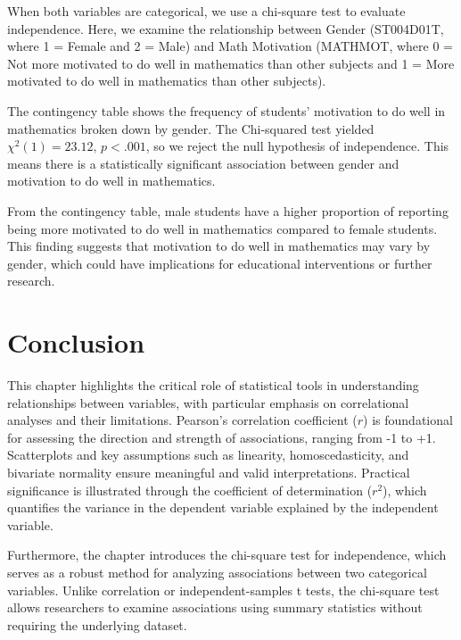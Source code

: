 \documentclass[
  letterpaper,
  DIV=11,
  numbers=noendperiod]{scrreprt}
\begin{document}

When both variables are categorical, we use a chi-square test to
evaluate independence. Here, we examine the relationship between Gender
(ST004D01T, where 1 = Female and 2 = Male) and Math Motivation (MATHMOT,
where 0 = Not more motivated to do well in mathematics than other
subjects and 1 = More motivated to do well in mathematics than other
subjects).

The contingency table shows the frequency of students' motivation to do
well in mathematics broken down by gender. The Chi-squared test yielded
\(\chi^2(1)=23.12, \, p<.001\), so we reject the null hypothesis of
independence. This means there is a statistically significant
association between gender and motivation to do well in mathematics.

From the contingency table, male students have a higher proportion of
reporting being more motivated to do well in mathematics compared to
female students. This finding suggests that motivation to do well in
mathematics may vary by gender, which could have implications for
educational interventions or further research.


\chapter*{Conclusion}\label{conclusion-10}


This chapter highlights the critical role of statistical tools in
understanding relationships between variables, with particular emphasis
on correlational analyses and their limitations. Pearson's correlation
coefficient (\(r\)) is foundational for assessing the direction and
strength of associations, ranging from -1 to +1. Scatterplots and key
assumptions such as linearity, homoscedasticity, and bivariate normality
ensure meaningful and valid interpretations. Practical significance is
illustrated through the coefficient of determination (\(r^2\)), which
quantifies the variance in the dependent variable explained by the
independent variable.

Furthermore, the chapter introduces the chi-square test for
independence, which serves as a robust method for analyzing associations
between two categorical variables. Unlike correlation or
independent-samples t tests, the chi-square test allows researchers to
examine associations using summary statistics without requiring the
underlying dataset.
\end{document}
